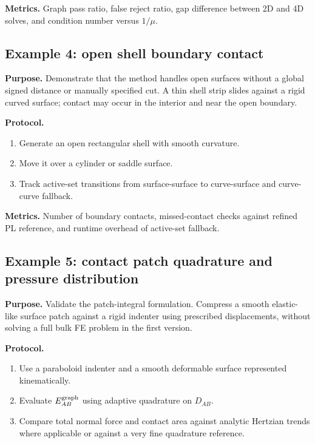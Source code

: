 \documentclass[preprint,12pt]{elsarticle}
\begin{document}
\textbf{Metrics.} Graph pass ratio, false reject ratio, gap difference between 2D and 4D solves, and condition number versus $1/\mu$.

\subsection{Example 4: open shell boundary contact}

\textbf{Purpose.} Demonstrate that the method handles open surfaces without a global signed distance or manually specified cut. A thin shell strip slides against a rigid curved surface; contact may occur in the interior and near the open boundary.

\textbf{Protocol.}
\begin{enumerate}[leftmargin=*]
    \item Generate an open rectangular shell with smooth curvature.
    \item Move it over a cylinder or saddle surface.
    \item Track active-set transitions from surface-surface to curve-surface and curve-curve fallback.
\end{enumerate}

\textbf{Metrics.} Number of boundary contacts, missed-contact checks against refined PL reference, and runtime overhead of active-set fallback.

\subsection{Example 5: contact patch quadrature and pressure distribution}

\textbf{Purpose.} Validate the patch-integral formulation. Compress a smooth elastic-like surface patch against a rigid indenter using prescribed displacements, without solving a full bulk FE problem in the first version.

\textbf{Protocol.}
\begin{enumerate}[leftmargin=*]
    \item Use a paraboloid indenter and a smooth deformable surface represented kinematically.
    \item Evaluate $E_{AB}^{\rm graph}$ using adaptive quadrature on $D_{AB}$.
    \item Compare total normal force and contact area against analytic Hertzian trends where applicable or against a very fine quadrature reference.
\end{enumerate}
\end{document}
